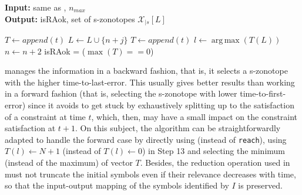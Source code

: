 \documentclass[journal]{IEEEtran}
\DeclareMathOperator*{\argmax}{arg\,max}
\begin{document}
\begin{algorithm}[t!] 
\caption{Input partitioning for finite-time RA }\label{alg:input_partitioning}
\hspace*{1mm}\textbf{Input:} same as , $n_{max}$  \\
\hspace*{1mm}\textbf{Output:} isRAok, set of s-zonotopes $\mathcal{X}_{|s}[L]$
\begin{algorithmic}[1]

\State $T \gets append(t)$
\State $L \gets L \cup \{n+j\}$ %
\State $T \gets append(t)$
\EndFor
{} %
\State $l \gets \argmax (T(L))$
\State $n \gets n+2$ %
\EndWhile
\State isRAok = ($\max(T) == 0$)
\end{algorithmic}
\end{algorithm}

 manages the information in a backward fashion, that is, it selects a s-zonotope with the higher time-to-last-error. This usually gives better results than working in a forward fashion (that is, selecting the s-zonotope with lower time-to-first-error) since it avoids to get stuck by exhaustively splitting up to the satisfaction of a constraint at time $t$, which, then, may have a small impact on the constraint satisfaction at $t+1$. On this subject, the algorithm can be straightforwardly adapted to handle the forward case by directly using  (instead of \texttt{reach}), using $T(l) \gets N+1$ (instead of $T(l) \gets 0$) in Step 13  and selecting the minimum (instead of the maximum) of vector $T$.
Besides, the reduction operation used in  must not truncate the initial symbols  even if their relevance decreases with time, so that the input-output mapping of the symbols identified by $I$ is preserved.

\end{document}

